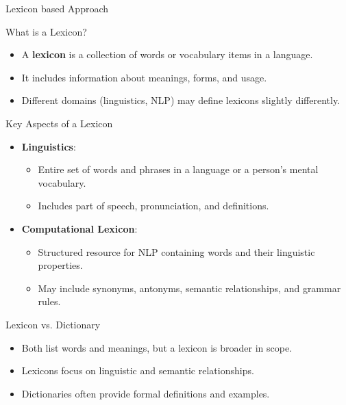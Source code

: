 \begin{frame}{}
\Huge {Lexicon based Approach}
\end{frame}
\begin{frame}{What is a Lexicon?}
	\begin{itemize}
		\item A \textbf{lexicon} is a collection of words or vocabulary items in a language.
		\item It includes information about meanings, forms, and usage.
		\item Different domains (linguistics, NLP) may define lexicons slightly differently.
	\end{itemize}
\end{frame}

\begin{frame}{Key Aspects of a Lexicon}
	\begin{itemize}
		\item \textbf{Linguistics}:
		\begin{itemize}
			\item Entire set of words and phrases in a language or a person's mental vocabulary.
			\item Includes part of speech, pronunciation, and definitions.
		\end{itemize}
		\item \textbf{Computational Lexicon}:
		\begin{itemize}
			\item Structured resource for NLP containing words and their linguistic properties.
			\item May include synonyms, antonyms, semantic relationships, and grammar rules.
		\end{itemize}
	\end{itemize}
\end{frame}

\begin{frame}{Lexicon vs. Dictionary}
	\begin{itemize}
		\item Both list words and meanings, but a lexicon is broader in scope.
		\item Lexicons focus on linguistic and semantic relationships.
		\item Dictionaries often provide formal definitions and examples.
	\end{itemize}
\end{frame}

